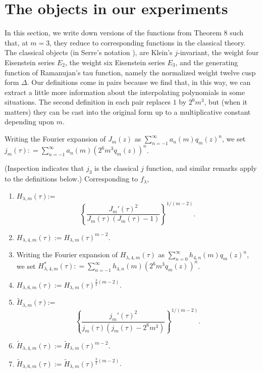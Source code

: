 \documentclass{article}
\begin{document}
\section{The objects in our experiments}
In this section, we
write down versions of 
the functions from Theorem 8
such that, 
at $m = 3$, they 
reduce  to corresponding
functions in the classical theory.
The classical objects
(in Serre's notation \cite{serre1970course}),
are Klein's $j$-invariant, the weight four
Eisenstein series $E_2$,
the weight six Eisenstein series $E_3$,
and the generating function of Ramanujan's
tau function, namely the normalized weight twelve
cusp form $\Delta$. Our definitions
come in pairs because we find that,
in this way, we can
extract a little more information
about the interpolating polynomials
in some situations.
The second definition in each pair
replaces $1$ by $2^6 m^3$, but
(when it matters) they can be cast into
the original form up to a multiplicative constant
depending upon $m$.
\begin{definition} 
Writing the Fourier expansion of $J_m(z)$ as
$\sum_{n = -1}^{\infty}a_n(m) q_m(z)^n$,
we set
$j_m(\tau): = \sum_{n = -1}^{\infty}a_n(m) (2^6 m^3 q_m(z))^n$.
\end{definition} \noindent
(Inspection indicates that $j_3$ 
is the classical $j$ function,
and similar remarks apply to the definitions below.)
Corresponding to $f_{\lambda}$,
\begin{definition}
\begin{enumerate}
\item
$H_{\lambda, m}(\tau)$:=
 $$\left \{
 \frac {J_m'(\tau)^2}
 {J_m(\tau)(J_m(\tau) -1)}
 \right \}^{1/(m-2)}.$$
 \item $H_{\lambda,4,m} (\tau) := 
 H_{\lambda, m}(\tau)^{m-2}.$
 \item Writing the Fourier expansion of $H_{\lambda,4, m}(\tau)$ as
$\sum_{n = 0}^{\infty} h_{4,n}(m) q_m(z)^n$,
we set
$H^*_{\lambda,4, m}(\tau): = 
\sum_{n = -1}^{\infty}h_{4,n}(m) (2^6 m^3 q_m(z))^n$.
 \item $H_{\lambda,6,m} (\tau) := 
 H_{\lambda, m}(\tau)^{\frac 32 (m-2)}.$
 \item
$\widetilde{H}_{\lambda, m}(\tau)$:=
 $$\left \{
 \frac {j_m'(\tau)^2}
 {j_m(\tau)(j_m(\tau) -2^6 m^3)}
 \right \}^{1/(m-2)}.$$
 \item $\widetilde{H}_{\lambda, 4, m}(\tau) :=
 \widetilde{H}_{\lambda, m}(\tau)^{m-2}$.
  \item $\widetilde{H}_{\lambda, 6, m}(\tau) :=
 \widetilde{H}_{\lambda, m}(\tau)^{\frac 32 (m-2)}$.
 \end{enumerate}
 \end{definition}
\end{document}
